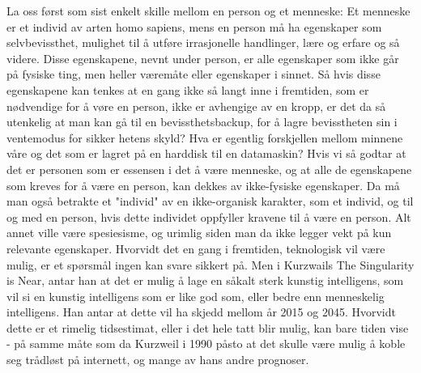 La oss først som sist enkelt skille mellom en person og et menneske: Et menneske er et individ av arten homo sapiens, mens en person må ha egenskaper som selvbevissthet, mulighet til å utføre irrasjonelle handlinger, lære og erfare og så videre. Disse egenskapene, nevnt under person, er alle egenskaper som ikke går på fysiske ting, men heller væremåte eller egenskaper i sinnet. Så hvis disse egenskapene kan tenkes at en gang ikke så langt inne i fremtiden, som er nødvendige for å vøre en person, ikke er avhengige av en kropp, er det da så utenkelig at man kan gå til en bevissthetsbackup, for å lagre bevisstheten sin i ventemodus for sikker hetens skyld? Hva er egentlig forskjellen mellom minnene våre og det som er lagret på en harddisk til en datamaskin?
Hvis vi så godtar at det er personen som er essensen i det å være menneske, og at alle de egenskapene som kreves for å være en person, kan dekkes av ikke-fysiske egenskaper. Da må man også betrakte et "individ" av en ikke-organisk karakter, som et individ, og til og med en person, hvis dette individet oppfyller kravene til å være en person. Alt annet ville være spesiesisme, og urimlig siden man da ikke legger vekt på kun relevante egenskaper. Hvorvidt det en gang i fremtiden, teknologisk vil være mulig, er et spørsmål ingen kan svare sikkert på. Men i Kurzwails The Singularity is Near, antar han at det er mulig å lage en såkalt sterk kunstig intelligens, som vil si en kunstig intelligens som er like god som, eller bedre enn menneskelig intelligens. Han antar at dette vil ha skjedd mellom år 2015 og 2045. Hvorvidt dette er et rimelig tidsestimat, eller i det hele tatt blir mulig, kan bare tiden vise - på samme måte som da Kurzweil i 1990 påsto at det skulle være mulig å koble seg trådløst på internett, og mange av hans andre prognoser.

